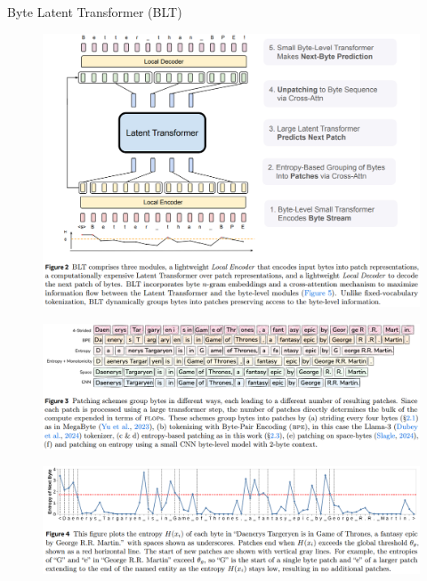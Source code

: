 \begin{frame}[allowframebreaks]{Byte Latent Transformer (BLT)}
\begin{figure}
        \includegraphics[height=0.9\textheight,width=1.05\textwidth,keepaspectratio]{images/recent-advance/blt-modules.png}
    \end{figure}
\framebreak
    \begin{figure}
        \centering
        \includegraphics[height=0.9\textheight,width=1.05\textwidth,keepaspectratio]{images/recent-advance/blt-patch-scheme.png}
    \end{figure}
\framebreak
    \begin{figure}
        \centering
        \includegraphics[height=0.9\textheight,width=1.05\textwidth,keepaspectratio]{images/recent-advance/blt-entropy.png}
    \end{figure}
\end{frame}

